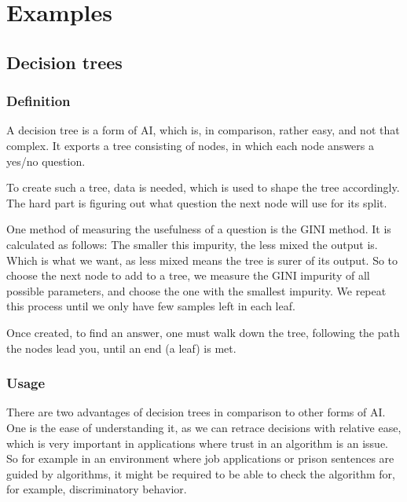 \chapter{Examples}




\section{Decision trees}
\subsection{Definition}

A decision tree is a form of AI, which is, in comparison, rather easy, and not that complex. It exports a tree consisting of nodes, in which each node answers a yes/no question. 

To create such a tree, data is needed, which is used to shape the tree accordingly.
The hard part is figuring out what question the next node will use for its split. 

One method of measuring the usefulness of a question is the GINI method.
It is calculated as follows: %
The smaller this impurity, the less mixed the output is. Which is what we want, as less mixed means the tree is surer of its output. 
So to choose the next node to add to a tree, we measure the GINI impurity of all possible parameters, and choose the one with the smallest impurity. We repeat this process until we only have few samples left in each leaf.

Once created, to find an answer, one must walk down the tree, following the path the nodes lead you, until an end (a leaf) is met.

\subsection{Usage}
There are two advantages of decision trees in comparison to other forms of AI. One is the ease of understanding it, as we can retrace decisions with relative ease, which is very important in applications where trust in an algorithm is an issue. So for example in an environment where job applications or prison sentences are guided by algorithms, it might be required to be able to check the algorithm for, for example, discriminatory behavior.

